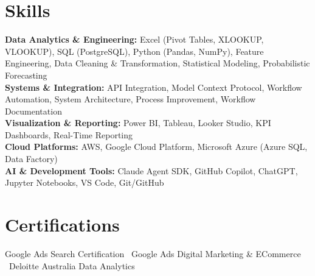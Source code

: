 \documentclass[10.5pt]{article}
\begin{document}
\section{Skills}

\textbf{Data Analytics \& Engineering:} Excel (Pivot Tables, XLOOKUP, VLOOKUP), SQL (PostgreSQL), Python (Pandas, NumPy), Feature Engineering, Data Cleaning \& Transformation, Statistical Modeling, Probabilistic Forecasting \\
\textbf{Systems \& Integration:} API Integration, Model Context Protocol, Workflow Automation, System Architecture, Process Improvement, Workflow Documentation \\
\textbf{Visualization \& Reporting:} Power BI, Tableau, Looker Studio, KPI Dashboards, Real-Time Reporting \\
\textbf{Cloud Platforms:} AWS, Google Cloud Platform, Microsoft Azure (Azure SQL, Data Factory) \\
\textbf{AI \& Development Tools:} Claude Agent SDK, GitHub Copilot, ChatGPT, Jupyter Notebooks, VS Code, Git/GitHub \\




\section*{Certifications}
Google Ads Search Certification \textbar\
Google Ads Digital Marketing \& ECommerce \textbar\
Deloitte Australia  Data Analytics
\end{document}
